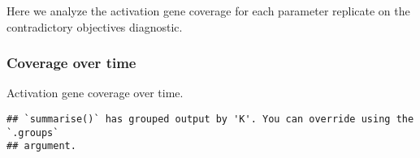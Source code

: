 \documentclass[]{book}
\newenvironment{Shaded}{\begin{snugshade}}{\end{snugshade}}
\newcommand{\DataTypeTok}[1]{\textcolor[rgb]{0.13,0.29,0.53}{#1}}
\newcommand{\KeywordTok}[1]{\textcolor[rgb]{0.13,0.29,0.53}{\textbf{#1}}}
\newcommand{\NormalTok}[1]{#1}
\newcommand{\OperatorTok}[1]{\textcolor[rgb]{0.81,0.36,0.00}{\textbf{#1}}}
\newcommand{\StringTok}[1]{\textcolor[rgb]{0.31,0.60,0.02}{#1}}
\begin{document}
Here we analyze the activation gene coverage for each parameter replicate on the contradictory objectives diagnostic.

\hypertarget{coverage-over-time-18}{%
\subsubsection{Coverage over time}\label{coverage-over-time-18}}

Activation gene coverage over time.

\begin{Shaded}
\end{Shaded}

\begin{verbatim}
## `summarise()` has grouped output by 'K'. You can override using the `.groups`
## argument.
\end{verbatim}
\end{document}
